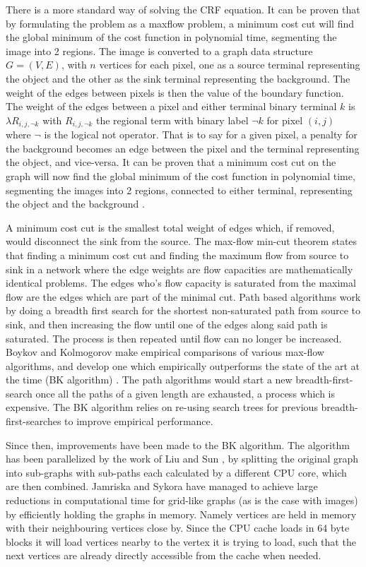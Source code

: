 There is a more standard way of solving the CRF equation. It can be proven that by formulating the problem as a maxflow problem, a minimum cost cut will find the global minimum of the cost function in polynomial time, segmenting the image into 2 regions.
The image is converted to a graph data structure $G=(V,E)$, with $n$ vertices for each pixel, one as a source terminal representing the object and the other as the sink terminal representing the background. The weight of the edges between pixels is then the value of the boundary function. The weight of the edges between a pixel and either terminal binary terminal $k$ is $\lambda R_{i,j,\neg k}$ with $R_{i,j,\neg k}$ the regional term with binary label $\neg k$ for pixel $(i,j)$ where $\neg$ is the logical not operator. That is to say for a given pixel, a penalty for the background becomes an edge between the pixel and the terminal representing the object, and vice-versa. It can be proven that a minimum cost cut on the graph will now find the global minimum of the cost function in polynomial time, segmenting the images into 2 regions, connected to either terminal, representing the object and the background \cite{graphCuts} \cite{minCut}. 

A minimum cost cut is the smallest total weight of edges which, if removed, would disconnect the sink from the source. The max-flow min-cut theorem states that finding a minimum cost cut and finding the maximum flow from source to sink in a network where the edge weights are flow capacities are mathematically identical problems. The edges who's flow capacity is saturated from the maximal flow are the edges which are part of the minimal cut. Path based algorithms work by doing a breadth first search for the shortest non-saturated path from source to sink, and then increasing the flow until one of the edges along said path is saturated. The process is then repeated until flow can no longer be increased. Boykov and Kolmogorov make empirical comparisons of various max-flow algorithms, and develop one which empirically outperforms the state of the art at the time (BK algorithm) \cite{minCut}. The path algorithms would start a new breadth-first-search once all the paths of a given length are exhausted, a process which is expensive. The BK algorithm relies on re-using search trees for previous breadth-first-searches to improve empirical performance. 

Since then, improvements have been made to the BK algorithm. The algorithm has been parallelized by the work of Liu and Sun \cite{BottomUpGraphCuts}, by splitting the original graph into sub-graphs with sub-paths each calculated by a different CPU core, which are then combined. Jamriska and Sykora have managed to achieve large reductions in computational time for grid-like graphs (as is the case with images) by efficiently holding the graphs in memory\cite{GridCuts}. Namely vertices are held in memory with their neighbouring vertices close by. Since the CPU cache loads in 64 byte blocks it will load vertices nearby to the vertex it is trying to load, such that the next vertices are already directly accessible from the cache when needed. 
